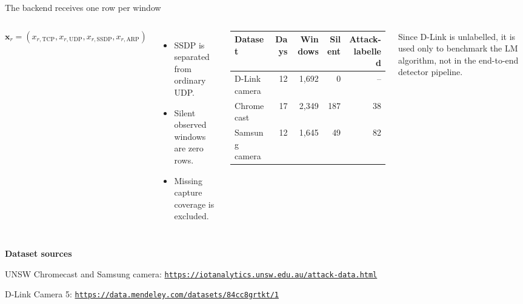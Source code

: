 \documentclass[aspectratio=169,10pt]{beamer}
\begin{document}
\begin{frame}{The backend receives one row per window}
\begin{columns}[c,onlytextwidth]
\[
\mathbf{x}_r=
(x_{r,\mathrm{TCP}},x_{r,\mathrm{UDP}},
x_{r,\mathrm{SSDP}},x_{r,\mathrm{ARP}})
\]
\begin{itemize}
  \item SSDP is separated from ordinary UDP.
  \item Silent observed windows are zero rows.
  \item Missing capture coverage is excluded.
\end{itemize}

\centering
\small
\begin{tabular}{@{}lrrrr@{}}
\toprule
Dataset & Days & Windows & Silent & Attack-labelled \\
\midrule
D-Link camera & 12 & 1,692 & 0 & -- \\
Chromecast & 17 & 2,349 & 187 & 38 \\
Samsung camera & 12 & 1,645 & 49 & 82 \\
\bottomrule
\end{tabular}

\vspace{0.45cm}
Since D-Link is unlabelled, it is used only to benchmark the LM algorithm, not
in the end-to-end detector pipeline.
\end{columns}

\vspace{0.30cm}
{\scriptsize
\textbf{Dataset sources}\par
UNSW Chromecast and Samsung camera:
\href{https://iotanalytics.unsw.edu.au/attack-data.html}{\color{burgundy}\nolinkurl{https://iotanalytics.unsw.edu.au/attack-data.html}}\par
D-Link Camera 5:
\href{https://data.mendeley.com/datasets/84cc8grtkt/1}{\color{burgundy}\nolinkurl{https://data.mendeley.com/datasets/84cc8grtkt/1}}
}
\end{frame}
\end{document}
